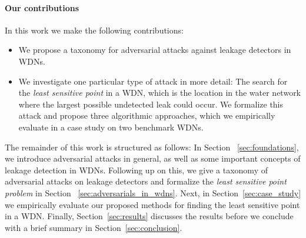 \paragraph*{Our contributions} In this work we make the following contributions:
\begin{itemize}
\item We propose a taxonomy for adversarial attacks against leakage detectors in WDNs.
\item We investigate one particular type of attack in more detail: The search for the \textit{least sensitive point} in a WDN, which is the location in the water network where the largest possible undetected leak could occur.
We formalize this attack and propose three algorithmic approaches, which we empirically evaluate in a case study on two benchmark WDNs.
\end{itemize}
The remainder of this work is structured as follows:
In Section ~\ref{sec:foundations}, we introduce adversarial attacks in
general, as well as some important concepts of leakage detection in WDNs. Following up on this, we give a taxonomy of adversarial attacks on leakage detectors and formalize the \textit{least sensitive
point problem} in Section ~\ref{sec:adversarials_in_wdns}. Next, in
Section~\ref{sec:case_study} we empirically evaluate our proposed methods for finding the least sensitive point in a WDN. Finally, Section~\ref{sec:results} discusses the results before we conclude
with a brief summary in Section~\ref{sec:conclusion}.
